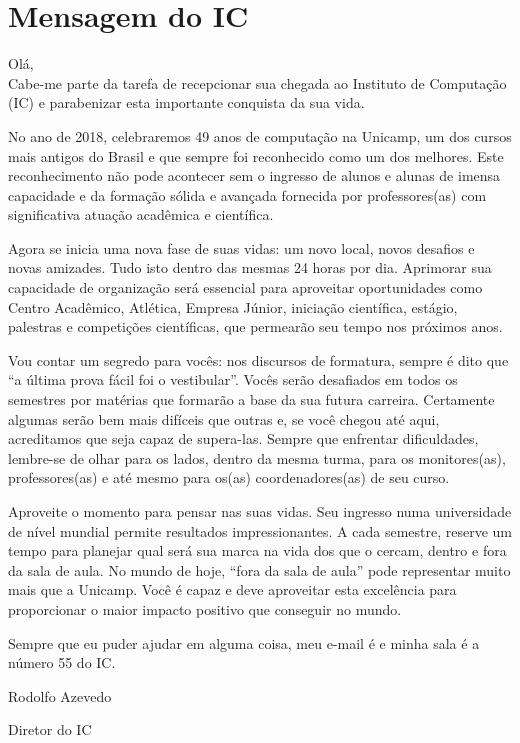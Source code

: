 
\section{Mensagem do IC}

Olá,\\

Cabe-me parte da tarefa de recepcionar sua chegada ao Instituto de Computação
(IC) e parabenizar esta importante conquista da sua vida.

No ano de 2018, celebraremos 49 anos de computação na Unicamp, um dos cursos
mais antigos do Brasil e que sempre foi reconhecido como um dos melhores. Este
reconhecimento não pode acontecer sem o ingresso de alunos e alunas de imensa
capacidade e da formação sólida e avançada fornecida por professores(as) com
significativa atuação acadêmica e científica.

Agora se inicia uma nova fase de suas vidas: um novo local, novos desafios e
novas amizades. Tudo isto dentro das mesmas 24 horas por dia. Aprimorar sua
capacidade de organização será essencial para aproveitar oportunidades como
Centro Acadêmico, Atlética, Empresa Júnior, iniciação científica, estágio,
palestras e competições científicas, que permearão seu tempo nos próximos anos.

Vou contar um segredo para vocês: nos discursos de formatura, sempre é dito que
``a última prova fácil foi o vestibular''. Vocês serão desafiados em todos os
semestres por matérias que formarão a base da sua futura carreira. Certamente
algumas serão bem mais difíceis que outras e, se você chegou até aqui,
acreditamos que seja capaz de supera-las. Sempre que enfrentar dificuldades,
lembre-se de olhar para os lados, dentro da mesma turma, para os monitores(as),
professores(as) e até mesmo para os(as) coordenadores(as) de seu curso.

Aproveite o momento para pensar nas suas vidas. Seu ingresso numa universidade
de nível mundial permite resultados impressionantes. A cada semestre, reserve
um tempo para planejar qual será sua marca na vida dos que o cercam, dentro e
fora da sala de aula. No mundo de hoje, ``fora da sala de aula'' pode
representar muito mais que a Unicamp. Você é capaz e deve aproveitar esta
excelência para proporcionar o maior impacto positivo que conseguir no mundo.

Sempre que eu puder ajudar em alguma coisa, meu e-mail é
 e minha sala é a número 55 do IC.\\

\begin{flushright}
Rodolfo Azevedo

Diretor do IC
\end{flushright}
